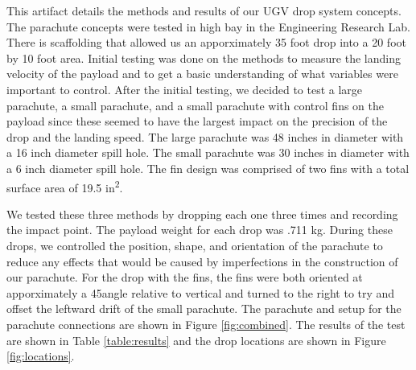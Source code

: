 \documentclass[]{auvsi_doc}
\begin{document}
\begin{AUVSITitlePage}
\begin{artifacttable}
\end{artifacttable}
\end{AUVSITitlePage}

This artifact details the methods and results of our UGV drop system concepts. The parachute concepts were tested in high bay in the Engineering Research Lab. There is scaffolding that allowed us an apporximately 35 foot drop into a 20 foot by 10 foot area. Initial testing was done on the methods to measure the landing velocity of the payload and to get a basic understanding of what variables were important to control. After the initial testing, we decided to test a large parachute, a small parachute, and a small parachute with control fins on the payload since these seemed to have the largest impact on the precision of the drop and the landing speed. The large parachute was 48 inches in diameter with a 16 inch diameter spill hole. The small parachute was 30 inches in diameter with a 6 inch diameter spill hole. The fin design was comprised of two fins with a total surface area of 19.5 in\textsuperscript{2}.

We tested these three methods by dropping each one three times and recording the impact point. The payload weight for each drop was .711 kg.  During these drops, we controlled the position, shape, and orientation of the parachute to reduce any effects that would be caused by imperfections in the construction of our parachute. For the drop with the fins, the fins were both oriented at apporximately a 45\degree angle relative to vertical and turned to the right to try and offset the leftward drift of the small parachute. The parachute and setup for the parachute connections are shown in Figure \ref{fig:combined}. The results of the test are shown in Table \ref{table:results} and the drop locations are shown in Figure \ref{fig:locations}. 
\end{document}
